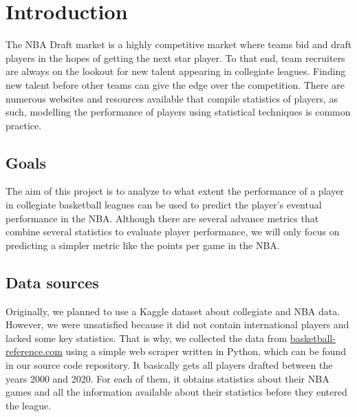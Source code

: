 
\section{Introduction}%
\label{sec:introduction}

The NBA Draft market is a highly competitive market where teams bid and draft
players in the hopes of getting the next star player. To that end, team
recruiters are always on the lookout for new talent appearing in collegiate
leagues. Finding new talent before other teams can give the edge over the
competition. There are numerous websites and resources available that compile
statistics of players, as such, modelling the performance of players using
statistical techniques is common practice.

\subsection{Goals}%
\label{sub:goals}

The aim of this project is to analyze to what extent the performance of a player
in collegiate basketball leagues can be used to predict the player's eventual
performance in the NBA. Although there are several advance metrics that combine several
statistics to evaluate player performance, we will only focus on
predicting a simpler metric like the points per game in the NBA.

\subsection{Data sources}%
\label{sub:data-sources}



Originally, we planned to use a Kaggle dataset about collegiate and NBA data. However, we were unsatisfied because it did not contain international players and lacked some key statistics. That is why, we collected the data from \href{http://www.basketball-reference.com}{basketball-reference.com} using a simple web scraper written in Python, which can be found in our source code repository. It basically gets all players drafted between the years 2000 and 2020. For each of them, it obtains statistics about their NBA games and all the information available about their statistics before they entered the league.

